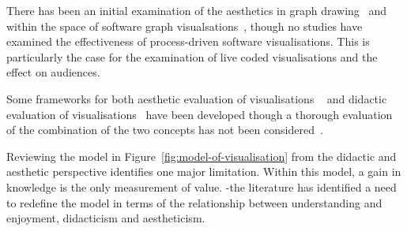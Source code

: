 There has been an initial examination of the aesthetics in graph drawing~ and within the space of software graph visualsations~, though no studies have examined the effectiveness of process-driven software visualisations. This is particularly the case for the examination of live coded visualisations and the effect on audiences.

Some frameworks for both aesthetic evaluation of visualisations
~ and didactic evaluation of visualisations~ have been developed though a thorough evaluation of the combination of the two concepts has not been considered~.

Reviewing the model in Figure~\ref{fig:model-of-visualisation} from the didactic and aesthetic perspective identifies one major limitation. Within this model, a gain in knowledge is the only measurement of value.
-the literature has identified a need to redefine the model in terms of the relationship between understanding and enjoyment, didacticism and aestheticism.


